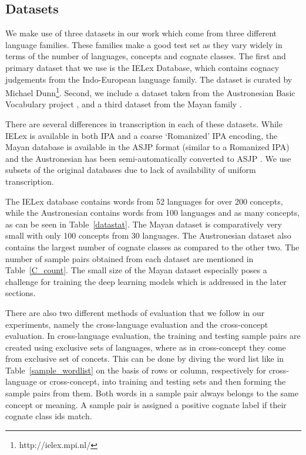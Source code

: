 \documentclass[11pt,letterpaper]{article}
\begin{document}
\subsection{Datasets}

We make use of three datasets in our work which come from three different language families. These families make a good test set as they vary widely in terms of the number of languages, concepts and cognate classes. The first and primary dataset that we use is the IELex Database, which contains cognacy judgements from the Indo-European language family. The dataset is curated by Michael Dunn\footnote{http://ielex.mpi.nl/}. Second, we include a dataset taken from the Austronesian Basic Vocabulary project \cite{greenhillBlust:08}, and a third dataset from the Mayan family \cite{wichmann:2008}. 

There are several differences in transcription in each of these datasets. While IELex is available in both IPA and a coarse `Romanized' IPA encoding, the Mayan database is available in the ASJP format (similar to a Romanized IPA) \cite{Brown:08} and the Austronesian has been semi-automatically converted to ASJP \cite{rama2016siamese}. We use subsets of the original databases due to lack of availability of uniform transcription.

The IELex database contains words from 52 languages for over 200 concepts, while the Austronesian contains words from 100 languages and as many concepts, as can be seen in Table~\ref{datastat}. The Mayan dataset is comparatively very small with only 100 concepts from 30 languages. The Austronesian dataset also contains the largest number of cognate classes as compared to the other two. The number of sample pairs obtained from each dataset are mentioned in Table~\ref{C_count}. The small size of the Mayan dataset especially poses a challenge for training the deep learning models which is addressed in the later sections. 

There are also two different methods of evaluation that we follow in our experiments, namely the cross-language evaluation and the cross-concept evaluation. In cross-language evaluation, the training and testing sample pairs are created using exclusive sets of languages, where as in cross-concept they come from exclusive set of concets. This can be done by diving the word list like in Table~\ref{sample_wordlist} on the basis of rows or column, respectively for cross-language or cross-concept, into training and testing sets and then forming the sample pairs from them. Both words in a sample pair always belongs to the same concept or meaning. A sample pair is assigned a positive cognate label if their cognate class ids match. 
\end{document}
